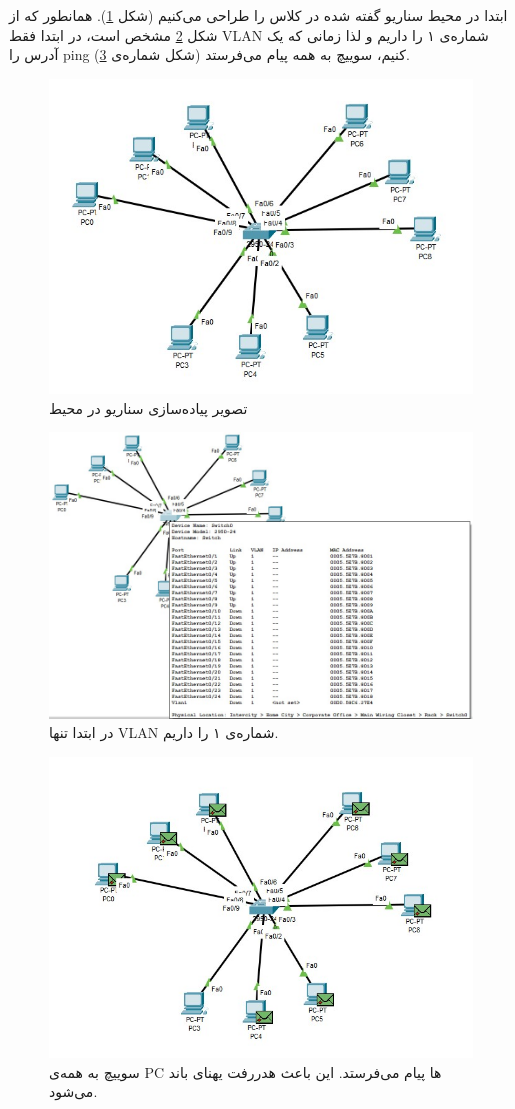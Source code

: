 \documentclass{article}
\begin{document}
ابتدا در محیط  سناریو گفته شده در کلاس را طراحی می‌کنیم (شکل \ref{fig:scenario-1}).
همانطور که از شکل \ref{fig:scenario-2} مشخص است، در ابتدا فقط VLAN شماره‌ی ۱ را داریم و لذا زمانی که یک آدرس را ping کنیم، سوییچ به همه‌ پیام می‌فرستد (شکل شماره‌ی \ref{fig:scenario-3}).

\begin{figure}[h!]
	\centering
	\includegraphics[width=0.6\columnwidth]{1.jpg}
	\caption{تصویر پیاده‌سازی سناریو در محیط }
	\label{fig:scenario-1}
\end{figure}

\begin{figure}[h!]
	\centering
	\includegraphics[width=0.6\columnwidth]{3.jpg}
	\caption{در ابتدا تنها VLAN شماره‌ی ۱ را داریم.}
	\label{fig:scenario-2}
\end{figure}

\begin{figure}[h!]
	\centering
	\includegraphics[width=0.6\columnwidth]{2.jpg}
	\caption{سوییچ به همه‌ی PC ها پیام می‌فرستد. این باعث هدر‌رفت يهنای باند می‌شود.}
	\label{fig:scenario-3}
\end{figure}
\end{document}
